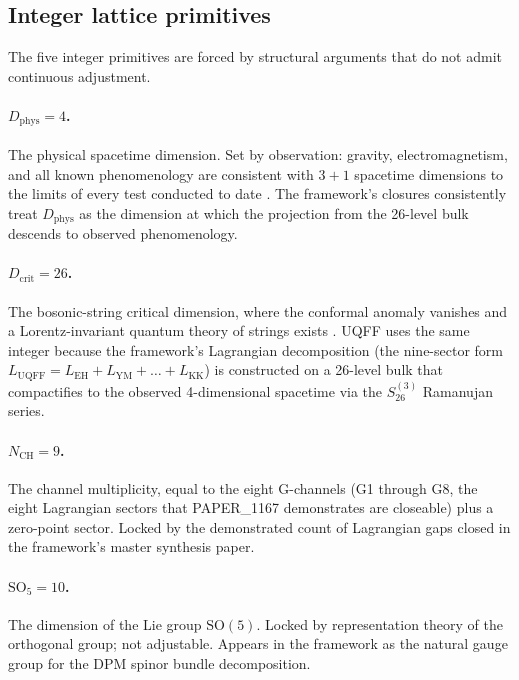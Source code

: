 \subsection{Integer lattice primitives}
\label{sec:integer_primitives}

The five integer primitives are forced by structural arguments that
do not admit continuous adjustment.

\paragraph{$D_{\text{phys}} = 4$.} The physical spacetime dimension.
Set by observation: gravity, electromagnetism, and all known
phenomenology are consistent with $3+1$ spacetime dimensions to the
limits of every test conducted to date \cite{LongRange2003}.
The framework's closures consistently treat $D_{\text{phys}}$ as the
dimension at which the projection from the 26-level bulk descends
to observed phenomenology.

\paragraph{$D_{\text{crit}} = 26$.} The bosonic-string critical
dimension, where the conformal anomaly vanishes and a Lorentz-invariant
quantum theory of strings exists
\cite{Polyakov1981, GSW1987}. UQFF uses the same integer because the
framework's Lagrangian decomposition (the nine-sector form
$L_{\text{UQFF}} = L_{\text{EH}}+L_{\text{YM}}+\ldots+L_{\text{KK}}$)
is constructed on a 26-level bulk that compactifies to the observed
4-dimensional spacetime via the $S_{26}^{(3)}$ Ramanujan series.

\paragraph{$N_{\text{CH}} = 9$.} The channel multiplicity, equal to
the eight G-channels (G1 through G8, the eight Lagrangian sectors
that PAPER\_1167 \cite{Murphy_PAPER_1167} demonstrates are closeable)
plus a zero-point sector. Locked by the demonstrated count of
Lagrangian gaps closed in the framework's master synthesis paper.

\paragraph{$\mathrm{SO}_5 = 10$.} The dimension of the Lie group
$\mathrm{SO}(5)$. Locked by representation theory of the orthogonal
group; not adjustable. Appears in the framework as the natural
gauge group for the DPM spinor bundle decomposition.

